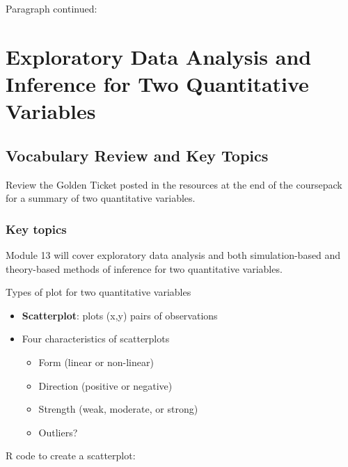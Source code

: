 \documentclass[
]{report}
\begin{document}
\newpage

Paragraph continued:

\newpage

\chapter{Exploratory Data Analysis and Inference for Two Quantitative Variables}\label{exploratory-data-analysis-and-inference-for-two-quantitative-variables}

\section{Vocabulary Review and Key Topics}\label{vocabulary-review-and-key-topics-1}

Review the Golden Ticket posted in the resources at the end of the coursepack for a summary of two quantitative variables.

\subsection{Key topics}\label{key-topics-1}

Module 13 will cover exploratory data analysis and both simulation-based and theory-based methods of inference for two quantitative variables.

Types of plot for two quantitative variables

\begin{itemize}
\item
  \textbf{Scatterplot}: plots (x,y) pairs of observations
\item
  Four characteristics of scatterplots

  \begin{itemize}
  \item
    Form (linear or non-linear)
  \item
    Direction (positive or negative)
  \item
    Strength (weak, moderate, or strong)
  \item
    Outliers?
  \end{itemize}
\end{itemize}

R code to create a scatterplot:
\end{document}

